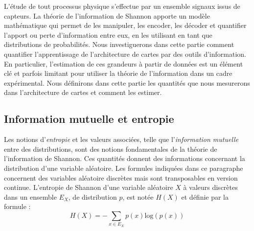 L'étude de tout processus physique s'effectue par un ensemble signaux issus de capteurs. La théorie de l'information de Shannon \cite{Shannon1948AMT} apporte un modèle mathématique qui permet de les manipuler, les encoder, les décoder et quantifier l'apport ou perte d'information entre eux, en les utilisant en tant que distributions de probabilités.
Nous investiguerons dans cette partie comment quantifier l'apprentissage de l'architecture de cartes par des outils d'information. 
En particulier, l'estimation de ces grandeurs à partir de données est un élément clé et parfois limitant pour utiliser la théorie de l'information dans un cadre expérimental. Nous définirons dans cette partie les quantités que nous mesurerons dans l'architecture de cartes et comment les estimer.

\subsection{Information mutuelle et entropie}

Les notions d'\emph{entropie} et les valeurs associées, telle que l'\emph{information mutuelle} entre des distributions, sont des notions fondamentales de la théorie de l'information de Shannon. Ces quantités donnent des informations concernant la distribution d'une variable aléatoire.
Les formules indiquées dans ce paragraphe concernent des variables aléatoire discrètes mais sont transposables en version continue.
L'entropie de Shannon d'une variable aléatoire $X$ à valeurs discrètes dans un ensemble $E_X$, de distribution $p$, est notée $H(X)$ et définie par la formule : 
\begin{equation}
H(X) = - \sum_{x \in E_X}{p(x)\textrm{log}(p(x))}
\end{equation}

